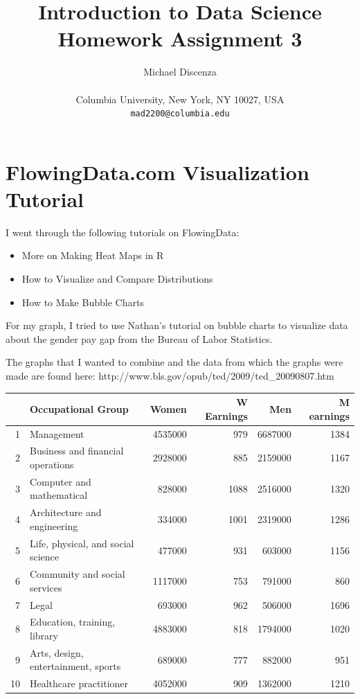 \documentclass{article}
\title{Introduction to Data Science\\Homework Assignment 3}
\author{
Michael Discenza\\\\
Columbia University, New York, NY 10027, USA \\
\texttt{mad2200@columbia.edu}
}
\begin{document}
\maketitle




\section{FlowingData.com Visualization Tutorial}

I went through the following tutorials on FlowingData:
\begin{itemize}\itemsep1pt \parskip0pt 
  \item More on Making Heat Maps in R 
  \item How to Visualize and Compare Distributions
  \item How to Make Bubble Charts
\end{itemize}
For my graph, I tried to use Nathan's tutorial on bubble charts to visualize data about the gender pay gap from the Bureau of Labor Statistics.  

The graphs that I wanted to combine and the data from which the graphs were made are found here:
http://www.bls.gov/opub/ted/2009/ted\_20090807.htm

\begin{table}[H]
\begin{center}
\begin{tabular}{rlrrrr}
  \hline
 & Occupational Group & Women & W Earnings & Men & M earnings \\ 
  \hline
1 & Management  & 4535000 & 979 & 6687000 & 1384 \\ 
  2 & Business and financial operations  & 2928000 & 885 & 2159000 & 1167 \\ 
  3 & Computer and mathematical  & 828000 & 1088 & 2516000 & 1320 \\ 
  4 & Architecture and engineering  & 334000 & 1001 & 2319000 & 1286 \\ 
  5 & Life, physical, and social science  & 477000 & 931 & 603000 & 1156 \\ 
  6 & Community and social services  & 1117000 & 753 & 791000 & 860 \\ 
  7 & Legal & 693000 & 962 & 506000 & 1696 \\ 
  8 & Education, training, library  & 4883000 & 818 & 1794000 & 1020 \\ 
  9 & Arts, design, entertainment, sports & 689000 & 777 & 882000 & 951 \\ 
  10 & Healthcare practitioner & 4052000 & 909 & 1362000 & 1210 \\ 
   \hline
\end{tabular}
\end{center}
\end{table}
\end{document}
